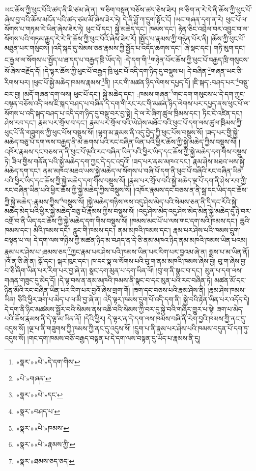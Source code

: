 ཡང་ཆོས་ཀྱི་ཕུང་པོའི་ཚད་ནི་ཇི་ཙམ་ཞེ་ན། ཁ་ཅིག་བསྟན་བཅོས་ཚད་ཅེས་ཟེར། ཁ་ཅིག་ན་རེ་དེ་ནི་ཆོས་ཀྱི་ཕུང་པོ་ཞེས་བྱ་བའི་ཆོས་མངོན་པའི་ཚད་ཙམ་མོ་ཞེས་ཟེར་ཏེ། དེ་ནི་ཤློ་ཀ་དྲུག་སྟོང་ངོ། །ཡང་གཞན་དག་ན་རེ། ཕུང་པོ་ལ་སོགས་པ་གཏམ་རེ་ཡིན་ཞེས་ཟེར་ཏེ། ཕུང་པོ་དང་། སྐྱེ་མཆེད་དང་། ཁམས་དང་། རྟེན་ཅིང་འབྲེལ་བར་འབྱུང་བ་ལ་སོགས་པའི་གཏམ་རྒྱུད་རེ་རེ་ནི་ཆོས་ཀྱི་ཕུང་པོའོ་ཞེས་ཟེར་རོ། །སྤྱོད་པ་རྣམས་ཀྱི་གཉེན་པོར་ནི། །ཆོས་ཀྱི་ཕུང་པོ་མཐུན་པར་གསུངས། །འདི་སྐད་དུ་སེམས་ཅན་རྣམས་ཀྱི་སྤྱོད་པ་འདོད་ཆགས་དང་། ཞེ་སྡང་དང་། གཏི་མུག་དང་། ང་རྒྱལ་ལ་སོགས་པ་སྤྱོད་པ་ཐ་དད་པ་བརྒྱད་ཁྲི་ཡོད་དེ། :དེ་དག་གི་\footnote{«སྣར་»«པེ་»དེ་དག་གིས་}གཉེན་པོར་ཆོས་ཀྱི་ཕུང་པོ་བརྒྱད་ཁྲི་གསུངས་སོ་ཞེས་བརྗོད་དོ། །དེ་ལྟར་ཆོས་ཀྱི་ཕུང་པོ་བརྒྱད་ཁྲི་ཕུང་པོ་འདི་དག་ཉིད་དུ་བསྡུས་པ། དེ་བཞིན་\footnote{«པེ་»གཞན་}གཞན་ཡང་ཅི་རིགས་པར། །ཕུང་པོ་སྐྱེ་མཆེད་ཁམས་རྣམས་\footnote{«སྣར་»«པེ་»དང་}ནི། །རང་གི་མཚན་ཉིད་ལེགས་དཔྱད་དོ། །ཇི་སྐད་:བཤད་པར་\footnote{«སྣར་»བཤད་པ་}བསྡུ་བར་བྱ། །མདོ་གཞན་དག་ལས། ཕུང་པོ་དང་། སྐྱེ་མཆེད་དང་། :ཁམས་གཞན་\footnote{«སྣར་»«པེ་»ཁམས་}གང་དག་གསུངས་པ་དེ་དག་ཀྱང་བསྟན་བཅོས་འདི་ལས་ཇི་སྐད་བཤད་པ་བཞིན་དེ་དག་གི་རང་རང་གི་མཚན་ཉིད་ལེགས་པར་དཔྱད་ནས་ཕུང་པོ་ལ་སོགས་པ་འདི་སྐད་བཤད་པ་འདི་དག་ཉིད་དུ་བསྡུ་བར་བྱ་སྟེ། དེ་ལ་རེ་ཞིག་ཚུལ་ཁྲིམས་དང་། ཏིང་ངེ་འཛིན་དང་། ཤེས་རབ་དང་། རྣམ་པར་གྲོལ་བ་དང་། རྣམ་པར་གྲོལ་བའི་ཡེ་ཤེས་མཐོང་བའི་ཕུང་པོ་དག་ལས་ཚུལ་ཁྲིམས་ཀྱི་ཕུང་པོ་ནི་གཟུགས་ཀྱི་ཕུང་པོས་བསྡུས་སོ། །ལྷག་མ་རྣམས་ནི་འདུ་བྱེད་ཀྱི་ཕུང་པོས་བསྡུས་སོ། །ཟད་པར་གྱི་སྐྱེ་མཆེད་བཅུ་པོ་དག་ལས་བརྒྱད་ནི་མ་ཆགས་པའི་རང་བཞིན་ཡིན་པའི་ཕྱིར་ཆོས་ཀྱི་སྐྱེ་མཆེད་ཀྱིས་བསྡུས་སོ། །འཁོར་རྣམས་དང་བཅས་ན་ནི་ཕུང་པོ་ལྔའི་རང་བཞིན་ཡིན་པའི་ཕྱིར་ཡིད་དང་ཆོས་ཀྱི་སྐྱེ་མཆེད་དག་གིས་བསྡུས་ཏེ། ཟིལ་གྱིས་གནོན་པའི་སྐྱེ་མཆེད་དག་ཀྱང་དེ་དང་འདྲའོ། །ཟད་པར་ནམ་མཁའ་དང་། རྣམ་ཤེས་མཐའ་ཡས་སྐྱེ་མཆེད་དག་དང་། ནམ་མཁའ་མཐའ་ཡས་སྐྱེ་མཆེད་ལ་སོགས་པ་བཞི་པོ་དག་ནི་ཕུང་པོ་བཞིའི་རང་བཞིན་ཡིན་པའི་ཕྱིར་ཡིད་དང་ཆོས་ཀྱི་སྐྱེ་མཆེད་དག་གིས་བསྡུས་སོ། །རྣམ་པར་གྲོལ་བའི་སྐྱེ་མཆེད་ལྔ་པོ་དག་ནི་ཤེས་རབ་ཀྱི་རང་བཞིན་ཡིན་པའི་ཕྱིར་ཆོས་ཀྱི་སྐྱེ་མཆེད་ཀྱིས་བསྡུས་སོ། །འཁོར་རྣམས་དང་བཅས་ན་ནི་སྒྲ་དང་ཡིད་དང་ཆོས་ཀྱི་སྐྱེ་མཆེད་:རྣམས་ཀྱིས་\footnote{«སྣར་»«པེ་»རྣམས་ཀྱི་}བསྡུས་སོ། །སྐྱེ་མཆེད་གཉིས་ལས་འདུ་ཤེས་མེད་པའི་སེམས་ཅན་ནི་དྲི་དང་རོའི་སྐྱེ་མཆེད་མེད་པའི་ཕྱིར་སྐྱེ་མཆེད་བཅུ་པོ་རྣམས་ཀྱིས་བསྡུས་སོ། །འདུ་ཤེས་མེད་འདུ་ཤེས་མེད་མིན་སྐྱེ་མཆེད་དུ་ཉེ་བར་འགྲོ་བ་ནི་ཡིད་དང་ཆོས་ཀྱི་སྐྱེ་མཆེད་དག་གིས་བསྡུས་སོ། །ཁམས་མང་པོ་པ་ལས་གང་དག་སའི་ཁམས་དང་། ཆུའི་ཁམས་དང་། མེའི་ཁམས་དང་། རླུང་གི་ཁམས་དང་། ནམ་མཁའི་ཁམས་དང་། རྣམ་པར་ཤེས་པའི་ཁམས་དྲུག་བསྟན་པ་ལ། དེ་དག་ལས་གཉིས་ཀྱི་མཚན་ཉིད་མ་བཤད་ན་དེ་ཅི་ནམ་མཁའ་ཉིད་ནམ་མཁའི་ཁམས་ཡིན་པའམ། རྣམ་པར་ཤེས་པ་:ཐམས་ཅད་\footnote{«སྣར་»ཐམས་ཅད་ཅད་}ཀྱང་རྣམ་པར་ཤེས་པའི་ཁམས་ཡིན་པར་རིག་པར་བྱའམ་ཞེ་ན། སྨྲས་པ་མ་ཡིན་ནོ། །འོ་ན་ཅི་ཞེ་ན། སྒོ་དང་། སྐར་ཁུང་དང་། ཁ་དང་སྣ་ལ་སོགས་པའི་བུ་ག་ནམ་མཁའི་ཁམས་ཞེས་བྱ། བུ་ག་ཞེས་བྱ་བ་ཅི་ཞིག་ཡིན་པར་རིག་པར་བྱ་ཞེ་ན། སྣང་དག་མུན་པ་དག་ཡིན་ལོ། །བུ་ག་ནི་སྣང་བ་དང་། མུན་པ་དག་ལས་གཞན་གཟུང་དུ་མེད་དོ། །དེ་ལྟ་བས་ན་ནམ་མཁའི་ཁམས་ནི་སྣང་བ་དང་མུན་པའི་རང་བཞིན་ཏེ། མཚན་མོ་དང་ཉིན་མོའི་རང་བཞིན་ཡིན་པར་རིག་པར་བྱའོ་ཞེས་གྲག་གོ། །ཟག་དང་བཅས་པའི་རྣམ་ཤེས་ནི། །རྣམ་ཤེས་ཁམས་ཡིན། ཅིའི་ཕྱིར་ཟག་པ་མེད་པ་ལ་མི་བྱ་ཞེ་ན། འདི་ལྟར་ཁམས་དྲུག་པོ་འདི་དག་ནི། སྐྱེ་བའི་རྟེན་ཡིན་པར་འདོད་དེ། དེ་དག་ནི་ཉིང་མཚམས་སྦྱོར་བའི་སེམས་ནས་འཆི་བའི་སེམས་ཀྱི་བར་དུ་སྐྱེ་བའི་གཞིར་གྱུར་པ་སྟེ། ཟག་པ་མེད་པའི་ཆོས་རྣམས་ནི་དེ་ལྟ་མ་ཡིན་ནོ། །དེའི་ཕྱིར། དེ་ལྟར་ན་དེ་དག་ལས་ཁམས་བཞི་ནི་རེག་བྱའི་ཁམས་ཀྱི་ནང་དུ་འདུས་སོ། །ལྔ་པ་ནི་གཟུགས་ཀྱི་ཁམས་ཀྱི་ནང་དུ་འདུས་སོ། །དྲུག་པ་ནི་རྣམ་པར་ཤེས་པའི་ཁམས་བདུན་པོ་དག་ཏུ་འདུས་སོ། །གང་དག་ཁམས་བཅོ་བརྒྱད་བསྟན་པ་དེ་དག་ལས་བསྟན་དུ་ཡོད་པ་རྣམས་ནི་དུ། 